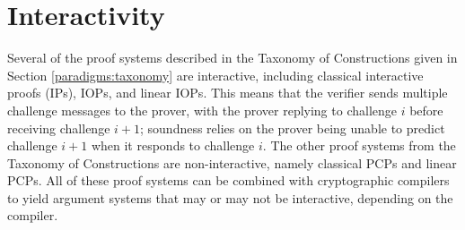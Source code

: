 \section{Interactivity}
\label{paradigms:interactivity} 




Several of the proof systems described in the Taxonomy of Constructions given in Section \ref{paradigms:taxonomy}
are interactive, including classical interactive proofs (IPs), IOPs, and linear IOPs. 
This means that the verifier sends multiple challenge messages to the prover,
with the prover replying to challenge $i$ before receiving challenge $i+1$;
soundness relies on the prover being unable to predict challenge $i+1$ when it responds to challenge $i$.
The other proof systems from the Taxonomy of Constructions are non-interactive, namely classical PCPs and linear PCPs. 
All of these proof systems can be combined with cryptographic
compilers to yield argument systems that may or may not be interactive, depending on the compiler.



